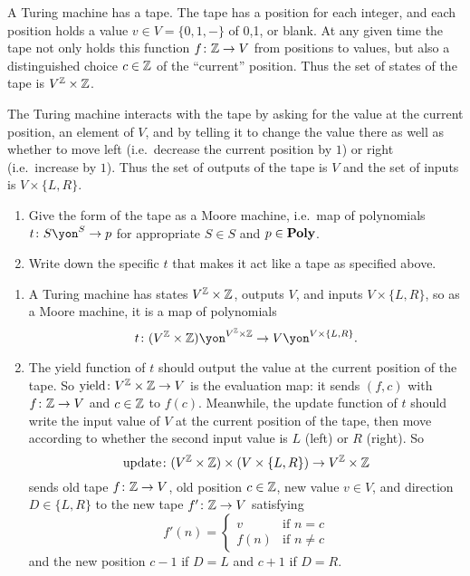 \documentclass[Book-Poly]{subfiles}
\begin{document}
\begin{exercise}
A Turing machine has a tape. The tape has a position for each integer, and each position holds a value $v\in V=\{0,1,-\}$ of 0,1, or blank. At any given time the tape not only holds this function $f\colon\mathbb{Z}\to V$ from positions to values, but also a distinguished choice $c\in\mathbb{Z}$ of the ``current'' position. Thus the set of states of the tape is $V^{\mathbb{Z}}\times\mathbb{Z}$.

The Turing machine interacts with the tape by asking for the value at the current position, an element of $V$, and by telling it to change the value there as well as whether to move left (i.e.\ decrease the current position by $1$) or right (i.e.\ increase by $1$). Thus the set of outputs of the tape is $V$ and the set of inputs is $V\times\{L,R\}$.

\begin{enumerate}
	\item Give the form of the tape as a Moore machine, i.e.\ map of polynomials $t\colon S\yon^S\to p$ for appropriate $S\in S$ and $p\in\mathbf{Poly}$.
	\item Write down the specific $t$ that makes it act like a tape as specified above.
\qedhere
\end{enumerate}
\begin{solution}
\begin{enumerate}
    \item A Turing machine has states $V^{\mathbb{Z}} \times \mathbb{Z}$, outputs $V$, and inputs $V \times \{L, R\}$, so as a Moore machine, it is a map of polynomials
    \[
        t \colon (V^\zz \times \zz)\yon^{V^\zz \times \zz} \to V\yon^{V \times \{L,R\}}.
    \]
    \item The yield function of $t$ should output the value at the current position of the tape. So $\text{yield} \colon V^{\mathbb{Z}} \times \mathbb{Z} \to V$ is the evaluation map: it sends $(f,c)$ with $f \colon \mathbb{Z} \to V$ and $c \in \mathbb{Z}$ to $f(c)$.
    Meanwhile, the update function of $t$ should write the input value of $V$ at the current position of the tape, then move according to whether the second input value is $L$ (left) or $R$ (right).
    So
    \[
        \text{update} \colon (V^{\mathbb{Z}} \times \mathbb{Z}) \times (V \times \{L,R\}) \to V^{\mathbb{Z}} \times \mathbb{Z}
    \]
    sends old tape $f \colon \mathbb{Z} \to V$, old position $c \in \mathbb{Z}$, new value $v \in V$, and direction $D \in \{L,R\}$ to the new tape $f' \colon \mathbb{Z} \to V$ satisfying
    \[
        f'(n) =
        \begin{cases}
            v & \text{if } n = c \\
            f(n) & \text{if } n \neq c
        \end{cases}
    \]
    and the new position $c-1$ if $D=L$ and $c+1$ if $D = R$.
\end{enumerate}
\end{solution}
\end{exercise}
\end{document}
